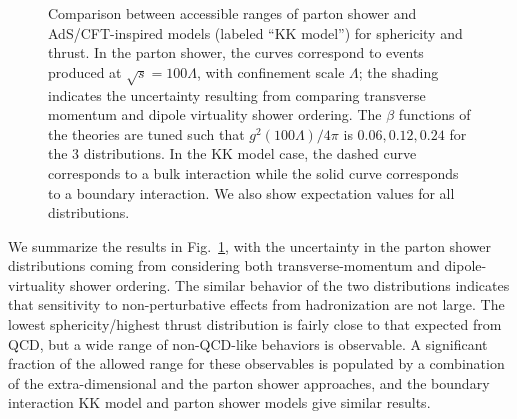 \begin{figure}[tb!]
	\caption{Comparison between accessible ranges of parton shower and AdS/CFT-inspired models (labeled ``KK model'') for sphericity and thrust. In the parton shower, the curves correspond to events produced at $\sqrt{s} = 100\Lambda$, with confinement scale $\Lambda$; the shading indicates the uncertainty resulting from comparing transverse momentum and dipole virtuality shower ordering. The $\beta$ functions of the theories are tuned such that $g^2(100\Lambda)/4\pi$ is $0.06, 0.12, 0.24$ for the 3 distributions. In the KK model case, the dashed curve corresponds to a bulk interaction while the solid curve corresponds to a boundary interaction. We also show expectation values for all distributions.}
	\label{fig:compplots}
\end{figure}

We summarize the results in Fig.~\ref{fig:compplots}, with the uncertainty in the parton shower distributions coming from considering both transverse-momentum and dipole-virtuality shower ordering. The similar behavior of the two distributions indicates that sensitivity to non-perturbative effects from hadronization are not large.  The lowest sphericity/highest thrust distribution is fairly close to that expected from QCD, but a wide range of non-QCD-like behaviors is observable. A significant fraction of the allowed range for these observables is populated by a combination of the extra-dimensional and the parton shower approaches, and the boundary interaction KK model and parton shower models give similar results.

